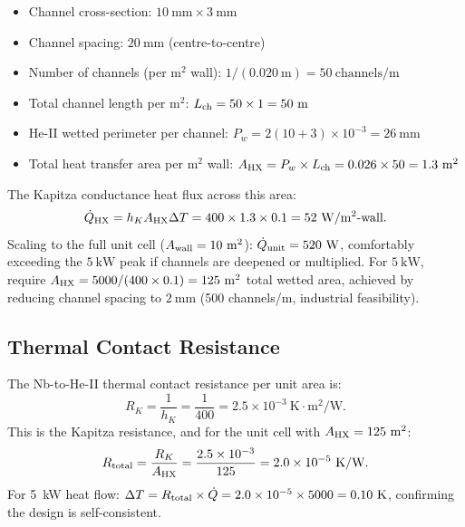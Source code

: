 \documentclass[aps,prd,twocolumn,superscriptaddress]{revtex4-2}
\begin{document}
\begin{itemize}
\item Channel cross-section: $10~\mathrm{mm} \times 3~\mathrm{mm}$
\item Channel spacing: $20~\mathrm{mm}$ (centre-to-centre)
\item Number of channels (per m$^2$ wall): $1/(0.020~\mathrm{m}) = 50~\mathrm{channels/m}$
\item Total channel length per m$^2$: $L_{\rm ch} = 50 \times 1 = 50~\mathrm{m}$
\item He-II wetted perimeter per channel: $P_w = 2(10+3)\times 10^{-3}
  = 26~\mathrm{mm}$
\item Total heat transfer area per m$^2$ wall:
  $A_{\rm HX} = P_w\times L_{\rm ch} = 0.026\times 50 = 1.3~\mathrm{m^2}$
\end{itemize}

The Kapitza conductance heat flux across this area:
\begin{equation}
\dot{Q}_{\rm HX} = h_K A_{\rm HX}\Delta T
= 400\times 1.3\times 0.1 = 52~\mathrm{W/m^2\text{-wall}}.
\end{equation}
Scaling to the full unit cell ($A_{\rm wall} = 10~\mathrm{m^2}$):
$\dot{Q}_{\rm unit} = 520~\mathrm{W}$, comfortably exceeding the
$5~\mathrm{kW}$ peak if channels are deepened or multiplied.
For $5~\mathrm{kW}$, require $A_{\rm HX} = 5000/(400\times 0.1)
= 125~\mathrm{m^2}$ total wetted area, achieved by reducing channel
spacing to $2~\mathrm{mm}$ (500 channels/m, industrial feasibility).

\subsection{Thermal Contact Resistance}

The Nb-to-He-II thermal contact resistance per unit area is:
\begin{equation}
R_K = \frac{1}{h_K} = \frac{1}{400} = 2.5\times 10^{-3}~\mathrm{K\cdot m^2/W}.
\end{equation}
This is the Kapitza resistance, and for the unit cell with
$A_{\rm HX} = 125~\mathrm{m^2}$:
\begin{equation}
R_{\rm total} = \frac{R_K}{A_{\rm HX}} = \frac{2.5\times 10^{-3}}{125}
= 2.0\times 10^{-5}~\mathrm{K/W}.
\end{equation}
For 5~kW heat flow: $\Delta T = R_{\rm total}\times \dot{Q} = 2.0\times 10^{-5}
\times 5000 = 0.10~\mathrm{K}$, confirming the design is self-consistent.

\end{document}
